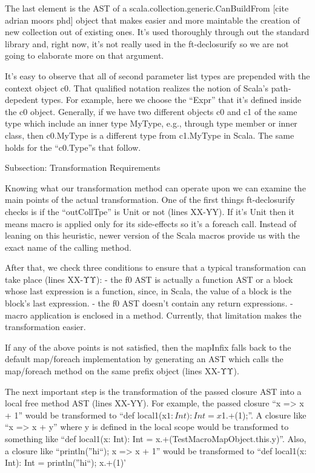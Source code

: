 The last element is the AST of a scala.collection.generic.CanBuildFrom [cite
adrian moors phd] object that makes easier and more maintable the creation of
new collection out of existing ones. It's used thoroughly through out the
standard library and,
right now, it's not really used in the ft-declosurify so we are not going to
elaborate more on that argument.

It's easy to observe that all of second parameter list types are prepended
with the context object c0. That qualified notation realizes the notion of
Scala's path-depedent types. For example, here we choose the ``Expr'' that it's
defined inside the c0 object. Generally, if we have two different objects c0 and
c1 of the same type which include an inner type MyType, e.g., through type
member or inner class,  then c0.MyType is a different type from c1.MyType in
Scala. The same holds for the ``c0.Type''s that follow.


Subsection: Transformation Requirements

Knowing what our transformation method can operate upon we can examine the
main points of the actual transformation. One of the first things ft-declosurify
checks is if the ``outCollTpe'' is Unit or not (lines XX-YY). If it's Unit then
it means
macro is applied only for its side-effects so it's a foreach call. Instead of
leaning on this heuristic, newer version of the Scala macros provide us with the
exact name of the calling method.

After that, we check three conditions to ensure that a typical
transformation can take place (lines XX-ΥΥ):
- the f0 AST is actually a function AST or a block whose last
expression is a function, since, in Scala, the value of a block is the block's
last expression.
- the f0 AST doesn't contain any return expressions.
- macro application is enclosed in a method. Currently, that limitation makes
the transformation easier.

If any of the above points is not satisfied, then the mapInfix falls back to the
default map/foreach implementation by generating an AST which
calls the map/foreach method on the same prefix object (lines XX-ΥΥ).

The next important step is the transformation of the passed closure AST
into a local free method AST (lines XX-YY). For example, the passed closure ``x
=> x + 1'' would be transformed to ``def local1(x$1: Int): Int = x$1.+(1);''. A
closure like ``x => x + y'' where y is defined in the local scope would be
transformed to something like ``def local1(x: Int): Int =
x.+(TestMacroMapObject.this.y)''. Also, a closure like ``{println(''hi``); x =>
x + 1}'' would be transformed to ``def local1(x: Int): Int = {println(''hi``);
x.+(1)}'


